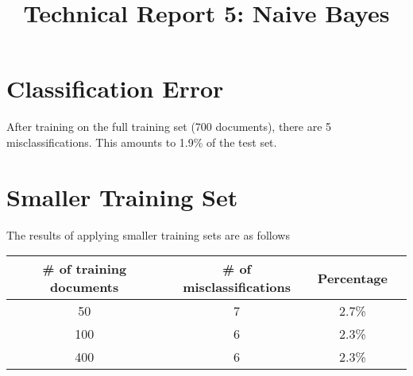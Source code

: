 \documentclass[10pt,a4paper]{article}
\date{}
\begin{document}
\title{Technical Report 5: Naive Bayes}

\maketitle

\section{Classification Error}
%
  After training on the full training set (700 documents), there are 5 misclassifications. This amounts to 1.9\% of the test set.


\section{Smaller Training Set}
%
  The results of applying smaller training sets are as follows


    \begin{table}[htb]
    \begin{center}
     \begin{tabular}{|c|c|c|c|} \hline
       \# of training documents & \# of misclassifications & Percentage \\ \hline
       50                       & 7                        & 2.7\% \\ \hline
       100                      & 6                        & 2.3\% \\ \hline
       400                      & 6                        & 2.3\% \\ \hline
     \end{tabular}
    \end{center}
    \label{tab:norm}
    \end{table}
\end{document}
